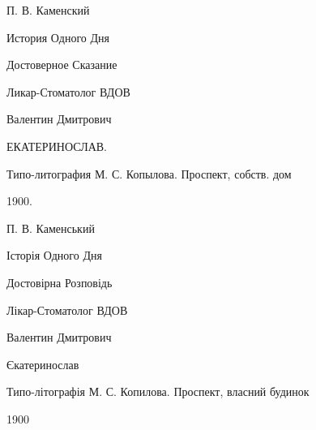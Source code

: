 \ifrus
П. В. Каменский

История Одного Дня

Достоверное Сказание

Ликар-Стоматолог ВДОВ

Валентин Дмитрович

ЕКАТЕРИНОСЛАВ.

Типо-литография М. С. Копылова. Проспект, собств. дом

1900.

\else\fi
\ifukr
П. В. Каменський

Історія Одного Дня

Достовірна Розповідь

Лікар-Стоматолог ВДОВ

Валентин Дмитрович

Єкатеринослав

Типо-літографія М. С. Копилова. Проспект, власний будинок

1900
\else\fi

